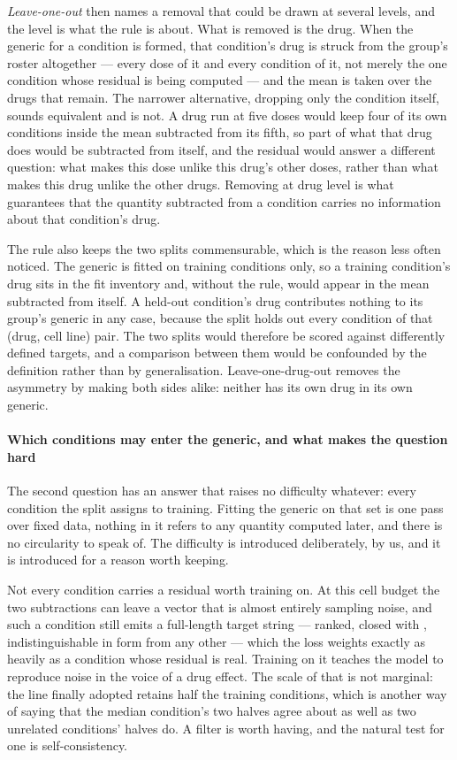 \emph{Leave-one-out} then names a removal that could be drawn at several levels,
and the level is what the rule is about. What is removed is the drug. When the
generic for a condition is formed, that condition's drug is struck from the group's
roster altogether --- every dose of it and every condition of it, not merely the one
condition whose residual is being computed --- and the mean is taken over the drugs
that remain. The narrower alternative, dropping only the condition itself, sounds
equivalent and is not. A drug run at five doses would keep four of its own
conditions inside the mean subtracted from its fifth, so part of what that drug does
would be subtracted from itself, and the residual would answer a different question:
what makes this dose unlike this drug's other doses, rather than what makes this
drug unlike the other drugs. Removing at drug level is what guarantees that the
quantity subtracted from a condition carries no information about that condition's
drug.

The rule also keeps the two splits commensurable, which is the reason less often
noticed. The generic is fitted on training conditions only, so a training
condition's drug sits in the fit inventory and, without the rule, would appear in
the mean subtracted from itself. A held-out condition's drug contributes nothing to
its group's generic in any case, because the split holds out every condition of that
(drug, cell line) pair. The two splits would therefore be scored against
differently defined targets, and a comparison between them would be confounded by
the definition rather than by generalisation. Leave-one-drug-out removes the
asymmetry by making both sides alike: neither has its own drug in its own generic.

\paragraph{Which conditions may enter the generic, and what makes the question
hard} The second question has an answer that raises no difficulty whatever: every
condition the split assigns to training. Fitting the generic on that set is one
pass over fixed data, nothing in it refers to any quantity computed later, and
there is no circularity to speak of. The difficulty is introduced deliberately,
by us, and it is introduced for a reason worth keeping.

Not every condition carries a residual worth training on. At this cell budget the
two subtractions can leave a vector that is almost entirely sampling noise, and
such a condition still emits a full-length target string --- ranked, closed with
\ENDCELL{}, indistinguishable in form from any other --- which the loss weights
exactly as heavily as a condition whose residual is real. Training on it teaches
the model to reproduce noise in the voice of a drug effect. The scale of that is
not marginal: the line finally adopted retains half the training conditions, which
is another way of saying that the median condition's two halves agree about as
well as two unrelated conditions' halves do. A filter is worth having, and the
natural test for one is self-consistency.

